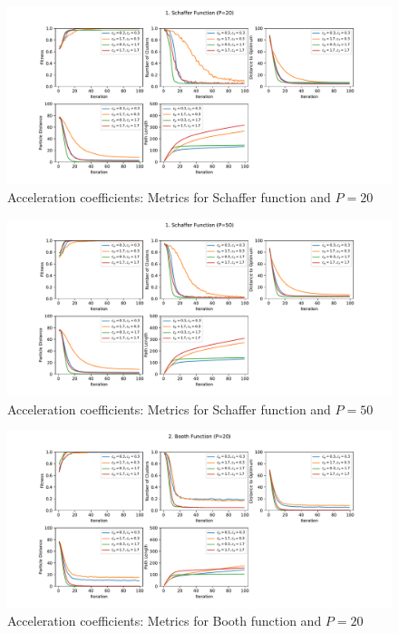 \documentclass[12pt]{article}
\begin{document}
\begin{figure}[h!]
	\centering
	\includegraphics[width=1\textwidth]{figures/ex4/ex4-1-20.pdf}
	\caption{Acceleration coefficients: Metrics for Schaffer function and $P=20$}
	\label{fig:ex4-1-20}
\end{figure}
\begin{figure}[h!]
	\centering
	\includegraphics[width=1\textwidth]{figures/ex4/ex4-1-50.pdf}
	\caption{Acceleration coefficients: Metrics for Schaffer function and $P=50$}
	\label{fig:ex4-1-50}
\end{figure}
\begin{figure}[h!]
	\centering
	\includegraphics[width=1\textwidth]{figures/ex4/ex4-2-20.pdf}
	\caption{Acceleration coefficients: Metrics for Booth function and $P=20$}
	\label{fig:ex4-2-20}
\end{figure}
\end{document}
